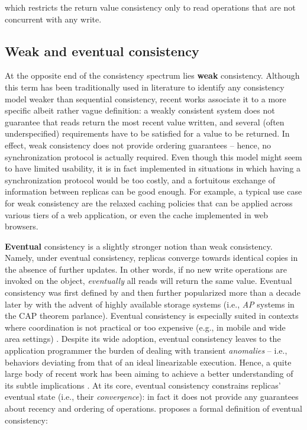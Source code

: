 \documentclass[letter, 11pt]{article}
\newcommand{\citeN}{\citet}
\renewcommand{\cite}{\citep}
\begin{document}
which restricts the return value consistency only to read operations that are not concurrent with any write. 





\subsection{Weak and eventual consistency}
\label{subsec:weak}
At the opposite end of the consistency spectrum lies \textbf{weak} consistency.
Although this term has been traditionally used in literature to identify any consistency model weaker than sequential consistency,
recent works \cite{Vogels:08,Bermbach.Kuhlenkamp:13} associate it 
to a more specific albeit rather vague definition: 
a weakly consistent system does not guarantee that reads return the most recent value written, 
and several (often underspecified) requirements have to be satisfied for a value to be returned.
In effect, weak consistency does not provide ordering guarantees -- 
hence, no synchronization protocol is actually required.
Even though this model might seem to have limited usability, 
it is in fact implemented in situations in which having a synchronization protocol would
be too costly, and a fortuitous exchange of information between
replicas can be good enough. 
For example, a typical use case for weak consistency are the relaxed caching policies that can be applied  across various tiers of a web application, or even the cache implemented in web browsers.




\textbf{Eventual} consistency is a slightly stronger notion than weak consistency. Namely, under eventual consistency, replicas converge towards identical copies in the absence of further updates.
In other words, 
if no new write operations are invoked on the object, \emph{eventually} all reads will return the same value.
Eventual consistency was first defined by \citeN{Terry.Demers.ea:94} and then further popularized more than a decade later by 
\citeN{Vogels:08} with the advent of
highly available storage systems (i.e., \emph{AP} systems in the CAP 
theorem parlance).
Eventual consistency is especially suited in contexts where coordination 
is not practical or too expensive (e.g., in mobile and wide area settings) \cite{Saito.Shapiro:05}. 
Despite its wide adoption, eventual consistency leaves to the application programmer the burden of dealing with transient \emph{anomalies} -- i.e., behaviors deviating from that of an ideal linearizable execution.
Hence, a quite large body of recent work has been aiming to achieve a better understanding of its subtle implications
\cite{Bermbach.Tai:11,Bernstein.Das:13,Bailis.Ghodsi:13,Bailis.ea:14}. At its core, eventual consistency constrains replicas' eventual state (i.e., their \emph{convergence}): 
in fact it does not provide any guarantees about recency and ordering of operations.
\citeN{Burckhardt:14} proposes a formal definition of eventual consistency:
\end{document}
